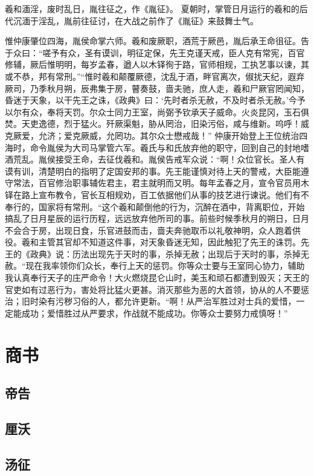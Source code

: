 \documentclass[a4paper,12pt,UTF8,twoside]{ctexbook}
\begin{document}
羲和湎淫，废时乱日，胤往征之，作《胤征》。
夏朝时，掌管日月运行的羲和的后代沉湎于淫乱，胤前往征讨，在大战之前作了《胤征》来鼓舞士气。

惟仲康肇位四海，胤侯命掌六师。羲和废厥职，酒荒于厥邑，胤后承王命徂征。告于众曰：“嗟予有众，圣有谟训，明征定保，先王克谨天戒，臣人克有常宪，百官修辅，厥后惟明明，每岁孟春，遒人以木铎徇于路，官师相规，工执艺事以谏，其或不恭，邦有常刑。”“惟时羲和颠覆厥德，沈乱于酒，畔官离次，俶扰天纪，遐弃厥司，乃季秋月朔，辰弗集于房，瞽奏鼓，啬夫驰，庶人走，羲和尸厥官罔闻知，昏迷于天象，以干先王之诛，《政典》曰：‘先时者杀无赦，不及时者杀无赦。’今予以尔有众，奉将天罚。尔众士同力王室，尚弼予钦承天子威命。火炎昆冈，玉石俱焚。天吏逸德，烈于猛火。歼厥渠魁，胁从罔治，旧染污俗，咸与维新。呜呼！威克厥爱，允济；爱克厥威，允罔功。其尔众士懋戒哉！”
仲康开始登上王位统治四海时，命令胤侯为大司马掌管六军。羲氏与和氏放弃他的职守，回到自己的封地嗜酒荒乱。胤侯接受王命，去征伐羲和。胤侯告戒军众说：“啊！众位官长。圣人有谟有训，清楚明白的指明了定国安邦的事。先王能谨慎对待上天的警戒，大臣能遵守常法，百官修治职事辅佐君主，君主就明而又明。每年孟春之月，宣令官员用木铎在路上宣布教令，官长互相规劝，百工依据他们从事的技艺进行谏说。他们有不奉行的，国家将有常刑。“这个羲和颠倒他的行为，沉醉在酒中，背离职位，开始搞乱了日月星辰的运行历程，远远放弃他所司的事。前些时候季秋月的朔日，日月不会合于房，出现日食，乐官进鼓而击，啬夫奔驰取币以礼敬神明，众人跑着供役。羲和主管其官却不知道这件事，对天象昏迷无知，因此触犯了先王的诛罚。先王的《政典》说：历法出现先于天时的事，杀掉无赦；出现后于天时的事，杀掉无赦。“现在我率领你们众长，奉行上天的惩罚。你等众士要与王室同心协力，辅助我认真奉行天子的庄严命令！大火燃烧昆仑山时，美玉和顽石都遭到毁灭；天王的官吏如有过恶行为，害处将比猛火更甚。消灭那些为恶的大首领，协从的人不要惩治；旧时染有污秽习俗的人，都允许更新。“啊！从严治军胜过对士兵的爱惜，一定能成功；爱惜胜过从严要求，作战就不能成功。你等众士要努力戒慎呀！”

\part{商书}

\chapter{帝告}

\chapter{厘沃}
\chapter{汤征}
\end{document}

